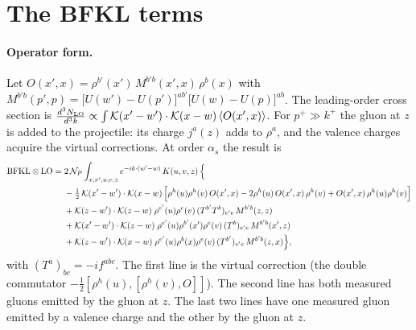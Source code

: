 \documentclass[10pt]{article}
\numberwithin{equation}{section}
\newcommand{\KK}{\mathcal K}
\newcommand{\NP}{\mathcal N_{P}}
\newcommand{\kp}{k^+}
\newcommand{\pp}{p^+}
\begin{document}
\section{The BFKL terms}\label{B:sec:bfkl}
\paragraph{Operator form.} Let $O(x',x)=\rho^{b'}(x')\,M^{b'b}(x',x)\,\rho^b(x)$ with $M^{b'b}(p',p)=\big[U(w')-U(p')\big]^{ab'}\big[U(w)-U(p)\big]^{ab}$. The leading-order cross section is $\frac{d^3N_{\rm LO}}{d^3k}\propto\int\KK(x'-w')\cdot\KK(x-w)\,\langle O(x',x)\rangle$. For $\pp\gg\kp$ the gluon at $z$ is added to the projectile: its charge $j^a(z)$ adds to $\rho^a$, and the valence charges acquire the virtual corrections. At order $\alpha_s$ the result is
\begin{align}
\text{BFKL}\otimes\text{LO}={}&2\,\NP\int_{x,x',u,v,z}e^{-ik\cdot(w'-w)}\,K(u,v,z)\,\Big\{\notag\\
&-\tfrac12\,\KK(x'-w')\cdot\KK(x-w)\,\Big[\rho^h(u)\rho^h(v)\,O(x',x)-2\rho^h(u)\,O(x',x)\,\rho^h(v)+O(x',x)\,\rho^h(u)\rho^h(v)\Big]\notag\\
&+\KK(z-w')\cdot\KK(z-w)\;\rho^{e'}(u)\rho^e(v)\,(T^{b'}T^b)_{e'e}\,M^{b'b}(z,z)\notag\\
&+\KK(x'-w')\cdot\KK(z-w)\;\rho^{e'}(u)\rho^{b'}(x')\rho^e(v)\,(T^b)_{e'e}\,M^{b'b}(x',z)\notag\\
&+\KK(z-w')\cdot\KK(x-w)\;\rho^{e'}(u)\rho^{b}(x)\rho^e(v)\,(T^{b'})_{e'e}\,M^{b'b}(z,x)\Big\},
\label{B:eq:Bop}
\end{align}
with $(T^a)_{bc}=-if^{abc}$. The first line is the virtual correction (the double commutator $-\frac12[\rho^h(u),[\rho^h(v),O]]$). The second line has both measured gluons emitted by the gluon at $z$. The last two lines have one measured gluon emitted by a valence charge and the other by the gluon at $z$.
\end{document}
